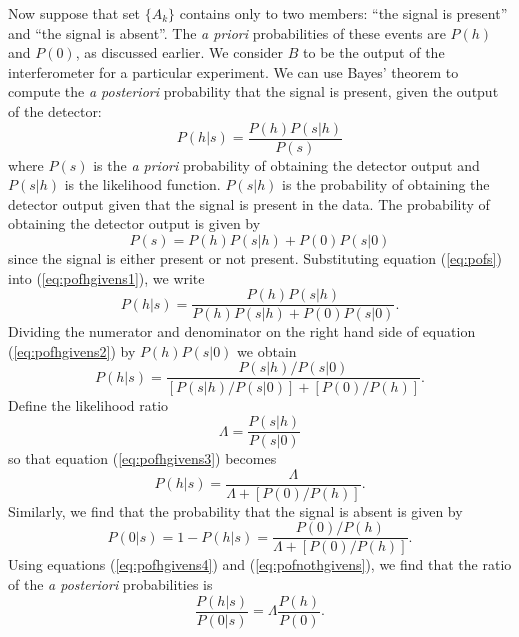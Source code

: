 Now suppose that set $\{A_k\}$ contains only to two members: ``the signal is
present'' and ``the signal is absent''. The \emph{a priori} probabilities of
these events are $P(h)$ and $P(0)$, as discussed earlier. We consider $B$ to
be the output of the interferometer for a particular experiment. We can
use Bayes' theorem to compute the \emph{a posteriori} probability that the
signal is present, given the output of the detector:
\begin{equation}
P(h|s) = \frac{P(h)P(s|h)}{P(s)}
\label{eq:pofhgivens1}
\end{equation}
where $P(s)$ is the \emph{a priori} probability of obtaining the detector
output and $P(s|h)$ is the likelihood function. $P(s|h)$ is the probability of
obtaining the detector output given that the signal is present in the data.
The probability of obtaining the detector output is given by
\begin{equation}
P(s) = P(h)P(s|h) + P(0)P(s|0)
\label{eq:pofs}
\end{equation}
since the signal is either present or not present.  Substituting equation
(\ref{eq:pofs}) into (\ref{eq:pofhgivens1}), we write
\begin{equation}
P(h|s) = \frac{P(h)P(s|h)}{P(h)P(s|h) + P(0)P(s|0)}.
\label{eq:pofhgivens2}
\end{equation}
Dividing the numerator and denominator on the right hand side of equation
(\ref{eq:pofhgivens2}) by $P(h)P(s|0)$ we obtain
\begin{equation}
P(h|s) = \frac{P(s|h)/P(s|0)}{[P(s|h)/P(s|0)] + [P(0)/P(h)]}.
\label{eq:pofhgivens3}
\end{equation}
Define the likelihood ratio
\begin{equation}
\Lambda = \frac{P(s|h)}{P(s|0)}
\label{eq:likelihooddef}
\end{equation}
so that equation (\ref{eq:pofhgivens3}) becomes
\begin{equation}
P(h|s) = \frac{\Lambda}{\Lambda + [P(0)/P(h)]}.
\label{eq:pofhgivens4}
\end{equation}
Similarly, we find that the probability that the signal is absent is given by
\begin{equation}
P(0|s) = 1 - P(h|s) = \frac{P(0)/P(h)}{\Lambda + [P(0)/P(h)]}.
\label{eq:pofnothgivens}
\end{equation}
Using equations (\ref{eq:pofhgivens4}) and (\ref{eq:pofnothgivens}), we find
that the ratio of the \emph{a posteriori} probabilities is
\begin{equation}
\frac{P(h|s)}{P(0|s)} = \Lambda\frac{P(h)}{P(0)}.
\label{eq:postratio}
\end{equation}

